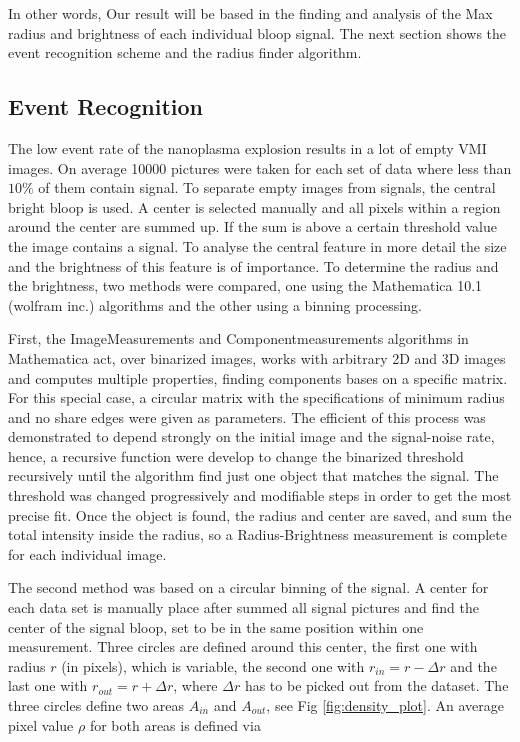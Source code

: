 In other words, Our result will be based in the finding and analysis of the Max radius and brightness of each individual bloop signal. The next section shows the event recognition scheme and the radius finder  algorithm.

\subsection{Event Recognition}

The low event rate of  the nanoplasma explosion results in a lot of empty VMI images. On average 10000 pictures were taken for each set of data where less than $10\%$ of them contain signal. To separate empty images from signals, the central bright bloop is used. A center is selected manually and all pixels within a region around the center are summed up. If the sum is above a certain threshold value the image contains a signal. To analyse the central feature in more detail the size and the brightness of this feature is of importance. To determine the radius and the brightness, two methods were compared, one using the Mathematica 10.1 (wolfram inc.) algorithms and the other using a binning processing.

First, the ImageMeasurements and Componentmeasurements algorithms in Mathematica act, over binarized images, works with arbitrary 2D and 3D images and computes multiple properties, finding components bases on a specific matrix. For this special case, a circular matrix with the specifications of minimum radius and no share edges were given as parameters. The efficient of this process was demonstrated to depend strongly on the initial image and the signal-noise rate, hence, a recursive function were develop to change the binarized threshold recursively until the algorithm find just one object that matches the signal. The threshold was changed progressively and modifiable steps in order to get the most precise fit. Once the object is found, the radius and center are saved, and sum the total intensity inside the radius, so a Radius-Brightness measurement is complete for each individual image.

The second method was based on a circular binning of the signal. A center for each data set is manually place after summed all signal pictures and find the center of the signal bloop, set to be in the same position within one measurement. Three circles are defined around this center, the first one with radius $r$ (in pixels), which is variable, the second one with $r_{in} = r-\Delta r$ and the last one with $r_{out} = r + \Delta r$, where $\Delta r$ has to be picked out from the dataset. The three circles define two areas $A_{in}$ and $A_{out}$, see Fig  \ref{fig:density_plot}. An average pixel value $\rho$ for both areas is defined via

